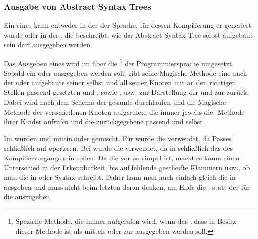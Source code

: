 \subsubsection{Ausgabe von Abstract Syntax Trees}
\label{sec:ausgabe_von_abstract_syntax_trees}

Ein  eines  kann entweder in der  der Sprache, für dessen Kompilierung er generiert wurde oder in der , die beschreibt, wie der Abstract Syntax Tree selbst aufgebaut sein darf ausgegeben werden.

Das Ausgeben eines  wird im  über die  \footnote{Spezielle Methode, die immer aufgerufen wird, wenn das , dass in Besitz dieser Methode ist als  mittels  oder zur  ausgegeben werden soll.} der Programmiersprache  umgesetzt. Sobald ein  oder  ausgegeben werden soll, gibt seine Magische Methode  eine nach der  oder  aufgebaute  seiner selbst und all seiner Knoten mit an den richtigen Stellen passend gesetzten   \smalltt{(} und  \smalltt{)} , sowie  ,  \smalltt{;} usw. zur Darstellung der  und zur  zurück. Dabei wird nach dem  Schema der gesamte  durchlaufen und die Magische -Methode der verschiedenen Knoten aufgerufen, die immer jeweils die -Methode ihrer Kinder aufrufen und die zurückgegebene  passend  und selbst .

Im  wurden  und  miteinander gemischt. Für  wurde die  verwendet, da Passes schließlich auf  operieren. Bei  wurde die  verwendet, da  in  schließlich das  des Kompiliervorgangs sein sollen. Da die  von  so simpel ist, macht es kaum einen Unterschied in der Erkennbarkeit, bis auf fehlende gescheifte Klammern \smalltt{()} usw., ob man die  in  oder  Syntax schreibt. Daher kann man auch einfach gleich die  in  ausgeben und muss nicht beim letzten  daran denken, am Ende die , statt der  für die  auszugeben.

